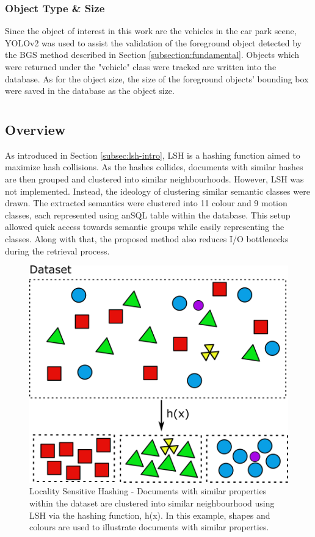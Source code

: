 \subsubsection{Object Type \& Size}
\label{objecttype}
Since the object of interest in this work are the vehicles in the car park scene, YOLOv2 was used to assist the validation of the foreground object detected by the BGS method described in Section \ref{subsection:fundamental}. Objects which were returned under the "vehicle" class were tracked are written into the database. As for the object size, the size of the foreground objects' bounding box were saved in the database as the object size.


\section{\versionOneExt }
\label{section:semantic_lsh}

\subsection{Overview}
As introduced in Section \ref{subsec:lsh-intro}, LSH is a hashing function aimed to maximize hash collisions.
As the hashes collides, documents with similar hashes are then grouped and clustered into similar neighbourhoods.
However, LSH was not implemented. Instead, the ideology of clustering similar semantic classes were drawn.
The extracted semantics were clustered into 11 colour and 9 motion classes, each represented using anSQL table within the database.
This setup allowed quick access towards semantic groups while easily representing the classes. Along with that, the proposed method also reduces I/O bottlenecks during the retrieval process.


\begin{figure}[hbt!]\centering
\includegraphics[width=.7\textwidth]{image/new/lsh.png}
\caption{Locality Sensitive Hashing - Documents with similar properties within the dataset are clustered into similar neighbourhood using LSH via the hashing function, h(x). In this example, shapes and colours are used to illustrate documents with similar properties.}
\label{fig:lshexample}
\end{figure}

